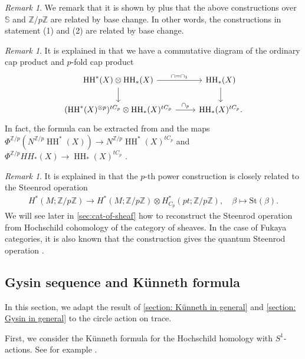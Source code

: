 \documentclass[11pt]{amsart}
\numberwithin{equation}{section}
\theoremstyle{plain}
\theoremstyle{definition}
\theoremstyle{remark}
\newtheorem{RMK}[rmk]{Remark}
\newcommand{\bZ} { {\mathbb{Z}}}
\newcommand\HH{\operatorname{HH}}
\begin{document}
\begin{RMK}
    We remark that it is shown by \cite[Theorem 1.15]{Rezchikov} plus \cite[Section III.6]{Nikolaus-Scholze-Ontopologicalcyclichomology} that the above constructions over $\mathbb{S}$ and $\bZ/p\bZ$ are related by base change. In other words, the constructions in statement (1) and (2) are related by base change.
\end{RMK}
\begin{RMK}
    It is explained in \cite[Section 4]{Rezchikov} that we have a commutative diagram of the ordinary cap product and $p$-fold cap product
    \[\begin{tikzcd}
    \HH^*(X) \otimes \HH_*(X) \ar[r,"\cap=\cap_1"] \ar[d,""] & \HH_*(X) \ar[d] \\
    (\HH^*(X)^{\otimes p})^{tC_p} \otimes \HH_*(X)^{tC_p} \ar[r,"\cap_p"] & \HH_*(X)^{tC_p}.
    \end{tikzcd}\]
    In fact, the formula can be extracted from \cite[Theorem 1.5]{Rezchikov} and the maps $\Phi^{\bZ/p}(N^{\bZ/p}\HH^*(X)) \to N^{\bZ/p}\HH^*(X)^{tC_p}$ and $\Phi^{\bZ/p}HH_*(X) \to \HH_*(X)^{tC_p}$ \cite[Section III.6]{Nikolaus-Scholze-Ontopologicalcyclichomology}.
\end{RMK}
\begin{RMK}
    It is explained in \cite[Section IV.1]{Nikolaus-Scholze-Ontopologicalcyclichomology} that the $p$-th power construction is closely related to the Steenrod operation
    \begin{align*}
    H^*(M; \bZ/p\bZ) \to H^*(M; \bZ/p\bZ) \otimes H_{C_p}^*(pt; \bZ/p\bZ), \quad \beta \mapsto \mathrm{St}(\beta).
    \end{align*}
    We will see later in \autoref{sec:cat-of-sheaf} how to reconstruct the Steenrod operation from Hochschild cohomology of the category of sheaves. In the case of Fukaya categories, it is also known that the construction  gives the quantum Steenrod operation \cite{Chen2}.
\end{RMK}


\subsection{Gysin sequence and Künneth formula}
In this section, we adapt the result of \autoref{section: Künneth in general} and \autoref{section: Gysin in general} to the circle action on trace.

First, we consider the K\"unneth formula for the Hochschild homology with $S^1$-actions. See for example \cite[Lemma 6.3]{Brav-Dyckerhoff2}.
\end{document}
